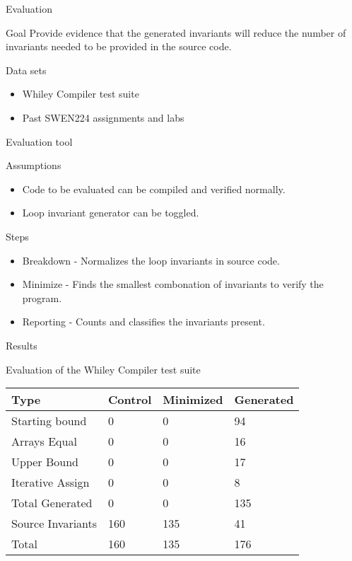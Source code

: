 \begin{frame}{Evaluation}

\begin{block}{Goal}
Provide evidence that the generated invariants will reduce the
number of invariants needed to be provided in the source code.
\end{block}

\begin{block}{Data sets}

\begin{itemize}
\item Whiley Compiler test suite
\item Past SWEN224 assignments and labs
\end{itemize}

\end{block}

\end{frame}


\begin{frame}{Evaluation tool}

\begin{block}{Assumptions}

\begin{itemize}
\item Code to be evaluated can be compiled and verified normally.
\item Loop invariant generator can be toggled.
\end{itemize}

\end{block}


\begin{block}{Steps}
\begin{itemize}
\item Breakdown - Normalizes the loop invariants in source code.
\item Minimize - Finds the smallest combonation of invariants to verify
the program.
\item Reporting - Counts and classifies the invariants present.
\end{itemize}
\end{block}

\end{frame}


\begin{frame}{Results}

Evaluation of the Whiley Compiler test suite

\begin{longtable}[]{@{}llll@{}}
\toprule
    Type & Control & Minimized & Generated\tabularnewline
\midrule
\endhead
Starting bound & 0 & 0 & 94\tabularnewline
Arrays Equal & 0 & 0 & 16\tabularnewline
Upper Bound & 0 & 0 & 17\tabularnewline
Iterative Assign & 0 & 0 & 8\tabularnewline
Total Generated & 0 & 0 & 135\tabularnewline
\hline
Source Invariants & 160 & 135 & 41\tabularnewline
\bottomrule
Total & 160 & 135 & 176\tabularnewline
\end{longtable}

\end{frame}



